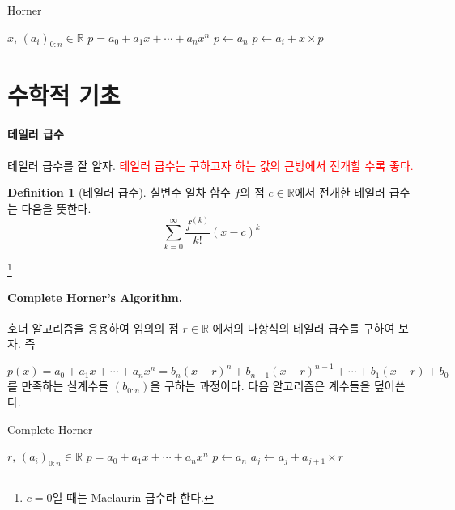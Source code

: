 \documentclass[a4paper, 11pt]{report}
\theoremstyle{definition}
\newtheorem*{defn}{Definition}
\begin{document}
\begin{algorithm}
\caption{Horner}\label{Horner1}
    \begin{algorithmic}
        \Require $ x,\,(a_i)_{0:n} \in \mathbb{R}$
        \Ensure $p =  a_0 + a_1x+\cdots +a_nx^n$
        \State $p \gets a_n$
            \State $ p \gets a_i + x\times p$
        \EndFor
    \end{algorithmic}
\end{algorithm}


\section{수학적 기초}

\paragraph{테일러 급수}
테일러 급수를 잘 알자. \textcolor{Red}{테일러 급수는 구하고자 하는 값의 근방에서 전개할 수록 좋다.}

\begin{defn}[테일러 급수]
실변수 일차 함수 $f$의 점 $c\in\mathbb{R}$에서 전개한 테일러 급수는 다음을 뜻한다.
    \begin{equation}
        \sum_{k=0}^{\infty}\frac{f^{(k)}}{k!}(x-c)^k
    \end{equation}
\end{defn}\footnote{$c=0$일 때는 Maclaurin 급수라 한다.}

\paragraph{Complete Horner's Algorithm.}
호너 알고리즘을 응용하여 임의의 점  $r \in \mathbb{R}$ 에서의 다항식의 테일러 급수를 구하여 보자.
즉 

\[
    p(x) = a_0 + a_1x+\cdots +a_nx^n
    = b_n(x-r)^n+b_{n-1}(x-r)^{n-1}+ \cdots + b_1(x-r)+b_0
\]
를 만족하는 실계수들 $(b_{0:n})$을 구하는 과정이다. 다음 알고리즘은 계수들을 덮어쓴다.
\begin{algorithm}[h]
    \caption{Complete Horner}\label{Horner2}
        \begin{algorithmic}
            \Require $ r,\,(a_i)_{0:n} \in \mathbb{R}$
            \Ensure $p =  a_0 + a_1x+\cdots +a_nx^n$
            \State $p \gets a_n$
                    \State $ a_j \gets a_j + a_{j+1}\times r$
                \EndFor
            \EndFor
    \end{algorithmic}
\end{algorithm}    
\end{document}
